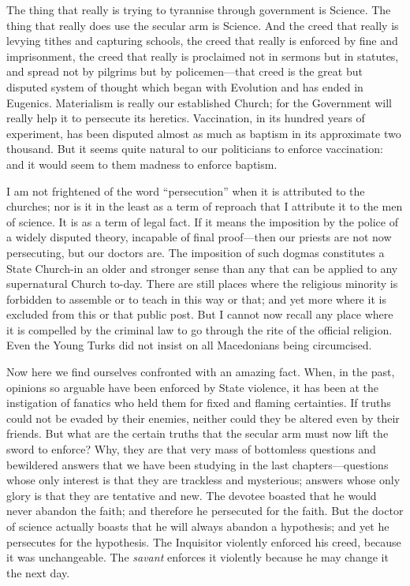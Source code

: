 \documentclass{book}
\begin{document}
The thing that really is trying to tyrannise through government is Science. The thing that really does use the secular arm is Science. And the creed that really is levying tithes and capturing schools, the creed that really is enforced by fine and imprisonment, the creed that really is proclaimed not in sermons but in statutes, and spread not by pilgrims but by policemen—that creed is the great but disputed system of thought which began with Evolution and has ended in Eugenics. Materialism is really our established Church; for the Government will really help it to persecute its heretics. Vaccination, in its hundred years of experiment, has been disputed almost as much as baptism in its approximate two thousand. But it seems quite natural to our politicians to enforce vaccination: and it would seem to them madness to enforce baptism.

I am not frightened of the word “persecution” when it is attributed to the churches; nor is it in the least as a term of reproach that I attribute it to the men of science. It is as a term of legal fact. If it means the imposition by the police of a widely disputed theory, incapable of final proof—then our priests are not now persecuting, but our doctors are. The imposition of such dogmas constitutes a State Church-in an older and stronger sense than any that can be applied to any supernatural Church to-day. There are still places where the religious minority is forbidden to assemble or to teach in this way or that; and yet more where it is excluded from this or that public post. But I cannot now recall any place where it is compelled by the criminal law to go through the rite of the official religion. Even the Young Turks did not insist on all Macedonians being circumcised.

Now here we find ourselves confronted with an amazing fact. When, in the past, opinions so arguable have been enforced by State violence, it has been at the instigation of fanatics who held them for fixed and flaming certainties. If truths could not be evaded by their enemies, neither could they be altered even by their friends. But what are the certain truths that the secular arm must now lift the sword to enforce? Why, they are that very mass of bottomless questions and bewildered answers that we have been studying in the last chapters—questions whose only interest is that they are trackless and mysterious; answers whose only glory is that they are tentative and new. The devotee boasted that he would never abandon the faith; and therefore he persecuted for the faith. But the doctor of science actually boasts that he will always abandon a hypothesis; and yet he persecutes for the hypothesis. The Inquisitor violently enforced his creed, because it was unchangeable. The \emph{savant} enforces it violently because he may change it the next day.
\end{document}
